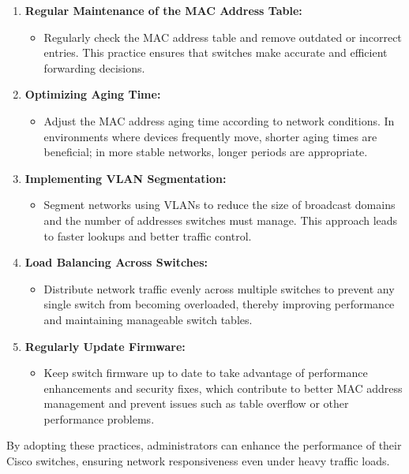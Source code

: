 \documentclass[11pt,a4paper]{article}
\begin{document}
    \begin{enumerate}
        \item \textbf{Regular Maintenance of the MAC Address Table:}
            \begin{itemize}
                \item Regularly check the MAC address table and remove outdated or incorrect entries. This practice ensures that switches make accurate and efficient forwarding decisions.
            \end{itemize}
        \item \textbf{Optimizing Aging Time:}
            \begin{itemize}
                \item Adjust the MAC address aging time according to network conditions. In environments where devices frequently move, shorter aging times are beneficial; in more stable networks, longer periods are appropriate.
            \end{itemize}
        \item \textbf{Implementing VLAN Segmentation:}
            \begin{itemize}
                \item Segment networks using VLANs to reduce the size of broadcast domains and the number of addresses switches must manage. This approach leads to faster lookups and better traffic control.
            \end{itemize}
        \item \textbf{Load Balancing Across Switches:}
            \begin{itemize}
                \item Distribute network traffic evenly across multiple switches to prevent any single switch from becoming overloaded, thereby improving performance and maintaining manageable switch tables.
            \end{itemize}
        \item \textbf{Regularly Update Firmware:}
            \begin{itemize}
                \item Keep switch firmware up to date to take advantage of performance enhancements and security fixes, which contribute to better MAC address management and prevent issues such as table overflow or other performance problems.
            \end{itemize}
    \end{enumerate}


    By adopting these practices, administrators can enhance the performance of their Cisco switches, ensuring network responsiveness even under heavy traffic loads.
\end{document}
